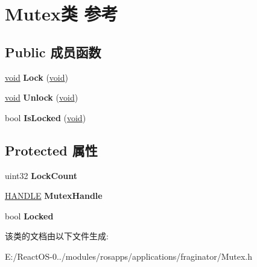 \hypertarget{class_mutex}{}\section{Mutex类 参考}
\label{class_mutex}
\subsection*{Public 成员函数}
\begin{DoxyCompactItemize}
\item 
\mbox{\label{class_mutex_a1726d7244983f7be74fcfa9cfb63745f}} 
\hyperlink{interfacevoid}{void} {\bfseries Lock} (\hyperlink{interfacevoid}{void})
\item 
\mbox{\label{class_mutex_a03150e8fa423f7e042661d350d238b84}} 
\hyperlink{interfacevoid}{void} {\bfseries Unlock} (\hyperlink{interfacevoid}{void})
\item 
\mbox{\label{class_mutex_a1ca92ea6c76fd68b465922d7e7c3910a}} 
bool {\bfseries Is\+Locked} (\hyperlink{interfacevoid}{void})
\end{DoxyCompactItemize}
\subsection*{Protected 属性}
\begin{DoxyCompactItemize}
\item 
\mbox{\label{class_mutex_a60531428dc80ed9400118644488786cb}} 
uint32 {\bfseries Lock\+Count}
\item 
\mbox{\label{class_mutex_afc6205119111f4454c5d3e3eca0caa02}} 
\hyperlink{interfacevoid}{H\+A\+N\+D\+LE} {\bfseries Mutex\+Handle}
\item 
\mbox{\label{class_mutex_a0c363826fa6ec5682d0fe93927734c47}} 
bool {\bfseries Locked}
\end{DoxyCompactItemize}


该类的文档由以下文件生成\+:\begin{DoxyCompactItemize}
\item 
E\+:/\+React\+O\+S-\/0../modules/rosapps/applications/fraginator/Mutex.\+h\end{DoxyCompactItemize}

